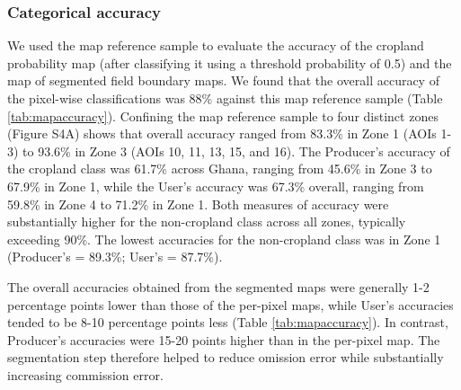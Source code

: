 \documentclass[11pt,a4paper]{article}
\begin{document}
\hypertarget{categorical-accuracy}{%
\subsubsection{Categorical accuracy}\label{categorical-accuracy}}

We used the map reference sample to evaluate the accuracy of the
cropland probability map (after classifying it using a threshold
probability of 0.5) and the map of segmented field boundary maps. We
found that the overall accuracy of the pixel-wise classifications was
88\% against this map reference sample (Table \ref{tab:mapaccuracy}).
Confining the map reference sample to four distinct zones (Figure S4A)
shows that overall accuracy ranged from 83.3\% in Zone 1 (AOIs 1-3) to
93.6\% in Zone 3 (AOIs 10, 11, 13, 15, and 16). The Producer's accuracy
of the cropland class was 61.7\% across Ghana, ranging from 45.6\% in
Zone 3 to 67.9\% in Zone 1, while the User's accuracy was 67.3\%
overall, ranging from 59.8\% in Zone 4 to 71.2\% in Zone 1. Both
measures of accuracy were substantially higher for the non-cropland
class across all zones, typically exceeding 90\%. The lowest accuracies
for the non-cropland class was in Zone 1 (Producer's = 89.3\%; User's =
87.7\%).

The overall accuracies obtained from the segmented maps were generally
1-2 percentage points lower than those of the per-pixel maps, while
User's accuracies tended to be 8-10 percentage points less (Table
\ref{tab:mapaccuracy}). In contrast, Producer's accuracies were 15-20
points higher than in the per-pixel map. The segmentation step therefore
helped to reduce omission error while substantially increasing
commission error.
\end{document}
